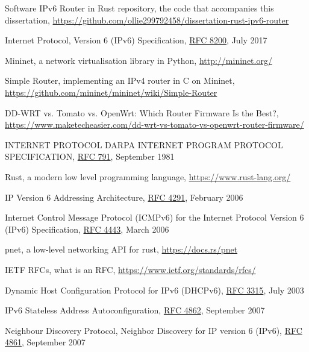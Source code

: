 \documentclass[12pt,a4paper,twoside,openany]{report}
\begin{document}
\begin{thebibliography}{1}

 Software IPv6 Router in Rust repository, the code that accompanies this dissertation, \url{https://github.com/ollie299792458/dissertation-rust-ipv6-router}

 Internet Protocol, Version 6 (IPv6) Specification, \href{https://tools.ietf.org/html/rfc8200}{RFC 8200}, July 2017

 Mininet, a network virtualisation library in Python, \url{http://mininet.org/}

 Simple Router, implementing an IPv4 router in C on Mininet, \url{https://github.com/mininet/mininet/wiki/Simple-Router}

 DD-WRT vs. Tomato vs. OpenWrt: Which Router Firmware Is the Best?, \url{https://www.maketecheasier.com/dd-wrt-vs-tomato-vs-openwrt-router-firmware/}

 INTERNET PROTOCOL DARPA INTERNET PROGRAM PROTOCOL SPECIFICATION, \href{https://tools.ietf.org/html/rfc791}{RFC 791}, September 1981

 Rust, a modern low level programming language, \url{https://www.rust-lang.org/}

 IP Version 6 Addressing Architecture, \href{https://tools.ietf.org/html/rfc4291}{RFC 4291}, February 2006

 Internet Control Message Protocol (ICMPv6) for the Internet Protocol Version 6 (IPv6) Specification, \href{https://tools.ietf.org/html/rfc4443}{RFC 4443}, March 2006

 pnet, a low-level networking API for rust, \url{https://docs.rs/pnet}

 IETF RFCs, what is an RFC, \url{https://www.ietf.org/standards/rfcs/}

 Dynamic Host Configuration Protocol for IPv6 (DHCPv6), \href{https://tools.ietf.org/html/rfc3315}{RFC 3315}, July 2003

 IPv6 Stateless Address Autoconfiguration, \href{https://tools.ietf.org/html/rfc4862}{RFC 4862}, September 2007

 Neighbour Discovery Protocol, Neighbor Discovery for IP version 6 (IPv6), \href{https://tools.ietf.org/html/rfc4861}{RFC 4861}, September 2007


\end{thebibliography}
\end{document}
